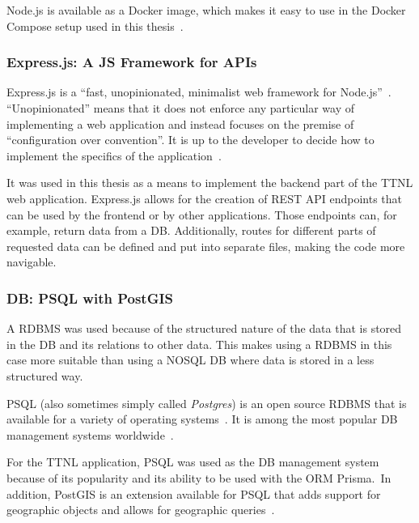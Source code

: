 Node.js is available as a Docker image, which makes it easy to use in the Docker Compose setup used in this thesis~\cite{docker_inc_node_2023}.

\subsubsection{Express.js: A \acl{JS} Framework for \aclp{API}}

Express.js is a ``fast, unopinionated, minimalist web framework for Node.js''~\cite{openjs_foundation_express_nodate}.
``Unopinionated'' means that it does not enforce any particular way of implementing a web application and instead focuses on the premise of ``configuration over convention''.
It is up to the developer to decide how to implement the specifics of the application~\cite{mardan_pro_2014}.

It was used in this thesis as a means to implement the backend part of the \ac{TTNL} web application.
Express.js allows for the creation of \ac{REST} \ac{API} endpoints that can be used by the frontend or by other applications.
Those endpoints can, for example, return data from a \ac{DB}.
Additionally, routes for different parts of requested data can be defined and put into separate files, making the code more navigable.

\subsubsection{\acl{DB}: \acl{PSQL} with PostGIS}

A \ac{RDBMS} was used because of the structured nature of the data that is stored in the \ac{DB} and its relations to other data.
This makes using a \ac{RDBMS} in this case more suitable than using a NOSQL \ac{DB} where data is stored in a less structured way.

\acl{PSQL} (also sometimes simply called \emph{Postgres}) is an open source \ac{RDBMS} that is available for a variety of operating systems~\cite{postgresql_global_development_group_postgresql_2023}.
It is among the most popular \ac{DB} management systems worldwide~\cite{db-engines_most_2023}.

For the \ac{TTNL} application, \ac{PSQL} was used as the \ac{DB} management system because of its popularity and its ability to be used with the \ac{ORM} Prisma.\
In addition, PostGIS is an extension available for \ac{PSQL} that adds support for geographic objects and allows for geographic queries~\cite{postgis_psc__osgeo_postgis_2023}.

